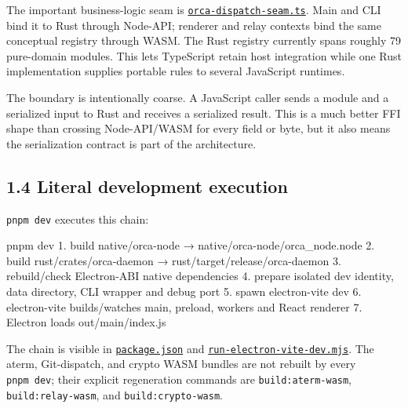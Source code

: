 \documentclass[
  10pt,
  letterpaper,
]{article}
\newenvironment{Shaded}{\begin{snugshade}}{\end{snugshade}}
\newcommand{\NormalTok}[1]{#1}
\begin{document}
The important business-logic seam is
\href{https://github.com/andrewyatesai/orca-alab/blob/d3ba1bcb17324714a838b2970e04fcd96989e84f/src/shared/orca-dispatch-seam.ts\#L1}{\texttt{orca-dispatch-seam.ts}}.
Main and CLI bind it to Rust through Node-API; renderer and relay
contexts bind the same conceptual registry through WASM. The Rust
registry currently spans roughly 79 pure-domain modules. This lets
TypeScript retain host integration while one Rust implementation
supplies portable rules to several JavaScript runtimes.

The boundary is intentionally coarse. A JavaScript caller sends a module
and a serialized input to Rust and receives a serialized result. This is
a much better FFI shape than crossing Node-API/WASM for every field or
byte, but it also means the serialization contract is part of the
architecture.

\subsection{1.4 Literal development
execution}\label{14-literal-development-execution}

\texttt{pnpm\ dev} executes this chain:

\begin{Shaded}
\begin{Highlighting}[]
\NormalTok{pnpm dev}
\NormalTok{  1. build native/orca{-}node → native/orca{-}node/orca\_node.node}
\NormalTok{  2. build rust/crates/orca{-}daemon → rust/target/release/orca{-}daemon}
\NormalTok{  3. rebuild/check Electron{-}ABI native dependencies}
\NormalTok{  4. prepare isolated dev identity, data directory, CLI wrapper and debug port}
\NormalTok{  5. spawn electron{-}vite dev}
\NormalTok{  6. electron{-}vite builds/watches main, preload, workers and React renderer}
\NormalTok{  7. Electron loads out/main/index.js}
\end{Highlighting}
\end{Shaded}

The chain is visible in
\href{https://github.com/andrewyatesai/orca-alab/blob/d3ba1bcb17324714a838b2970e04fcd96989e84f/package.json\#L42}{\texttt{package.json}}
and
\href{https://github.com/andrewyatesai/orca-alab/blob/d3ba1bcb17324714a838b2970e04fcd96989e84f/config/scripts/run-electron-vite-dev.mjs\#L9}{\texttt{run-electron-vite-dev.mjs}}.
The aterm, Git-dispatch, and crypto WASM bundles are not rebuilt by
every \texttt{pnpm\ dev}; their explicit regeneration commands are
\texttt{build:aterm-wasm}, \texttt{build:relay-wasm}, and
\texttt{build:crypto-wasm}.
\end{document}
